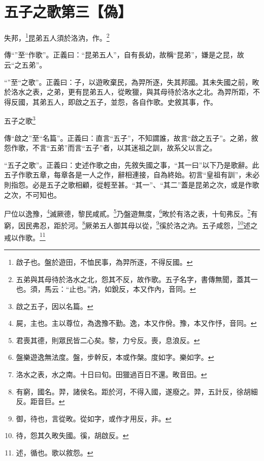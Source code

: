 \section{五子之歌第三【偽】}


失邦，\footnote{啟子也。盤於遊田，不恤民事，為羿所逐，不得反國。}昆弟五人須於洛汭，作。\footnote{五弟與其母待於洛水之北，怨其不反，故作歌。五子名字，書傳無聞，蓋其一也。須，馬云：“止也。”汭，如銳反，本又作內，音同。}


{\noindent\zhuan{}\fzbyks 傳“”至“作歌”。正義曰：“昆弟五人”，自有長幼，故稱“昆弟”，嫌是之昆，故云“之五弟”。 \par}

{\noindent\shu{}\fzkt “”至“之歌”。正義曰：子，以遊畋棄民，為羿所逐，失其邦國。其未失國之前，畋於洛水之表，之弟，更有昆弟五人，從畋獵，與其母待於洛水之北。為羿所距，不得反國，其弟五人，即啟之五子，並怨，各自作歌。史敘其事，作。 \par}

五子之歌\footnote{啟之五子，因以名篇。}


{\noindent\zhuan{}\fzbyks 傳“啟之”至“名篇”。正義曰：直言“五子”，不知謂誰，故言“啟之五子”。之弟，敘怨作歌，不言“五弟”而言“五子”者，以其迷祖之訓，故系父以言之。 \par}

{\noindent\shu{}\fzkt “五子之歌”。正義曰：史述作歌之由，先敘失國之事，“其一曰”以下乃是歌辭。此五子作歌五章，每章各是一人之作，辭相連接，自為終始。初言“皇祖有訓”，未必則指怨。必是五子之歌相顧，從輕至甚。“其一”、“其二”蓋是昆弟之次，或是作歌之次，不可知也。 \par}

尸位以逸豫，\footnote{屍，主也。主以尊位，為逸豫不勤。逸，本又作佾。豫，本又作忬，音同。}滅厥德，黎民咸貳。\footnote{君喪其德，則眾民皆二心矣。黎，力兮反。喪，息浪反。}乃盤遊無度，\footnote{盤樂遊逸無法度。盤，步幹反，本或作槃。度如字。樂如字。}畋於有洛之表，十旬弗反。\footnote{洛水之表，水之南。十日曰旬。田獵過百日不還。畋音田。}有窮，因民弗忍，距於河。\footnote{有窮，國名。羿，諸侯名。距於河，不得入國，遂廢之。羿，五計反，徐胡細反。距音巨。}厥弟五人御其母以從，\footnote{御，待也，言從畋。從如字，或作才用反，非。}徯於洛之汭。五子咸怨，\footnote{待，怨其久畋失國。徯，胡啟反。}述之戒以作歌。\footnote{述，循也。歌以敘怨。}


